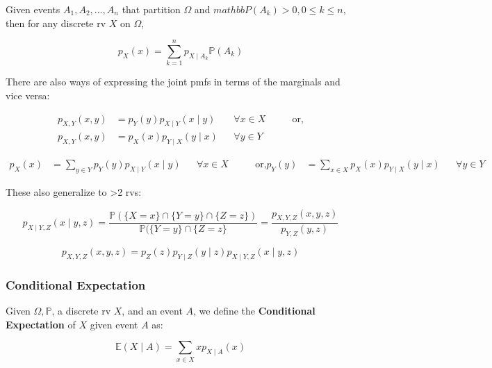 \documentclass{article}
\begin{document}
Given events $A_1, A_2, \dots, A_n$ that partition $\Omega$ and
$mathbb{P}(A_k) > 0, 0 \leq k \leq n$, then for any discrete rv $X$ on
$\Omega$,

\begin{equation}
  \tag{Conditional Total Probability}
  \boxed{
    p_X(x) = \sum_{k=1}^n p_{X \mid A_k} \mathbb{P}(A_k)
  }
\end{equation}

There are also ways of expressing the joint pmfs in terms of the
marginals and vice versa:

\begin{equation}
  \tag{Product Rule of Sorts}
  \boxed{
    \begin{aligned}
      p_{X,Y}(x,y)
      &= p_Y(y) p_{X\mid Y}(x\mid y)
      && \forall x \in X
      &&& \text{ or,} \\
      p_{X,Y}(x,y)
      &= p_X(x) p_{Y\mid X}(y\mid x)
      && \forall y \in Y
    \end{aligned}
  }
\end{equation}

\begin{equation}
  \tag{Total-Prob Rule of Sorts}
  \boxed{
    \begin{aligned}
      p_X(x)
      &= \sum_{y \in Y} p_Y(y) p_{X\mid Y}(x \mid y)
      && \forall x \in X
      &&& \text{ or,}
      p_Y(y)
      &= \sum_{x \in X} p_X(x) p_{Y \mid X} (y\mid x)
      && \forall y \in Y
    \end{aligned}
  }
\end{equation}

These also generalize to >2 rvs:

\[
  p_{X\mid Y,Z}(x\mid y,z) = \frac{\mathbb{P}(\{X=x\} \cap \{Y=y\}
    \cap \{Z = z\})} {\mathbb{P}(\{Y=y\} \cap \{Z=z\}} =
  \frac{p_{X,Y,Z} (x,y,z)} {p_{Y,Z}(y,z)}
\]

\[
  p_{X,Y,Z}(x,y,z) = p_Z(z) p_{Y \mid Z}(y\mid z) p_{X\mid Y,Z} (x
  \mid y,z)
\]

\subsubsection{Conditional Expectation}

Given $\Omega, \mathbb{P}$, a discrete rv $X$, and an event $A$, we
define the \textbf{Conditional Expectation} of $X$ given event $A$ as:

\begin{equation}
  \tag{Conditional Expectation}
  \boxed{
    \mathbb{E}(X \mid A) = \sum_{x\in X} xp_{X\mid A}(x)
  }
\end{equation}
\end{document}
